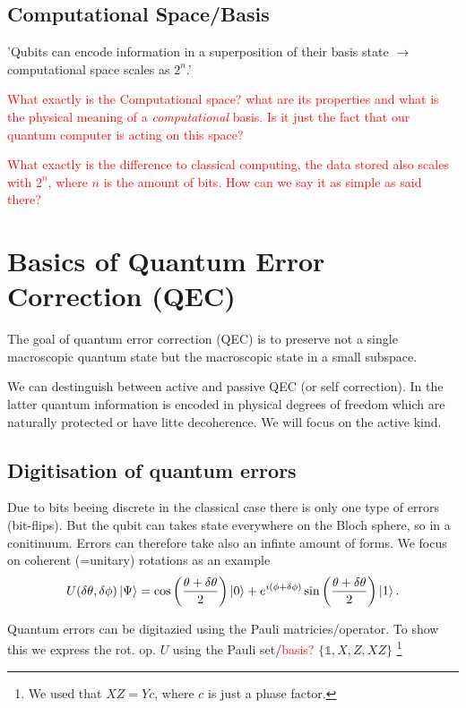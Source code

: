  
\subsection{Computational Space/Basis}
'Qubits can encode information in a superposition of their basis state $\rightarrow$ computational space scales as $2^n$.' \cite{QECintro}

\textcolor{red}{What exactly is the Computational space? what are its properties and what is the physical meaning of a \textit{computational} basis. 
Is it just the fact that our quantum computer is acting on this space?}

\textcolor{red}{What exactly is the difference to classical computing, the data stored also scales with $2^n$, where $n$ is the amount of bits.
How can we say it as simple as said there?
}


\section{Basics of Quantum Error Correction (QEC)}
The goal of quantum error correction (QEC) is to preserve not a single macroscopic quantum state but the macroscopic state in a small subspace. \cite{QECmemory}

We can destinguish between active and passive QEC (or self correction).
In the latter quantum information is encoded in physical degrees of freedom which are naturally protected or have litte decoherence. \cite{QECmemory}
We will focus on the active kind.


\subsection{Digitisation of quantum errors}
Due to bits beeing discrete in the classical case there is only one type of errors (bit-flips). 
But the qubit can takes state everywhere on the Bloch sphere, so in a conitinuum. 
Errors can therefore take also an infinte amount of forms.
We focus on coherent (=unitary) rotations as an example
\begin{equation}
    U(\delta \theta, \delta \phi) \ket{\Psi}=
    \cos\left(\frac{\theta + \delta \theta}{2}\right) \ket{0} +
    e^{i(\phi + \delta \phi)} 
    \sin\left(\frac{\theta + \delta \theta}{2}\right) \ket{1}.
\end{equation} 

Quantum errors can be digitazied using the Pauli matricies/operator. 
To show this we express the rot. op. $U$ using the Pauli set/\textcolor{red}{basis?} 
$\{\mathds{1},{X},{Z},{XZ}\}$
\footnote{We used that $XZ=Yc$, where $c$ is just a phase factor.}

